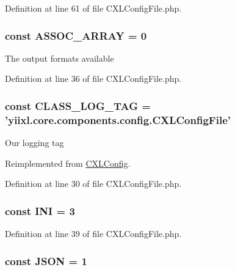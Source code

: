 Definition at line 61 of file CXLConfigFile.php.

\hypertarget{classCXLConfigFile_a97ec175641362d5bd37ac7fc47849bbb}{
\subsubsection[{ASSOC\_\-ARRAY}]{\setlength{\rightskip}{0pt plus 5cm}const {\bf ASSOC\_\-ARRAY} = 0}}
\label{classCXLConfigFile_a97ec175641362d5bd37ac7fc47849bbb}
The output formats available 

Definition at line 36 of file CXLConfigFile.php.

\hypertarget{classCXLConfigFile_aa607ab5e557e6ebb60b85c5a20ad067f}{
\subsubsection[{CLASS\_\-LOG\_\-TAG}]{\setlength{\rightskip}{0pt plus 5cm}const {\bf CLASS\_\-LOG\_\-TAG} = 'yiixl.core.components.config.CXLConfigFile'}}
\label{classCXLConfigFile_aa607ab5e557e6ebb60b85c5a20ad067f}
Our logging tag 

Reimplemented from \hyperlink{classCXLConfig_aa607ab5e557e6ebb60b85c5a20ad067f}{CXLConfig}.



Definition at line 30 of file CXLConfigFile.php.

\hypertarget{classCXLConfigFile_a5dd04489aced210c3386be64b79e25a4}{
\subsubsection[{INI}]{\setlength{\rightskip}{0pt plus 5cm}const {\bf INI} = 3}}
\label{classCXLConfigFile_a5dd04489aced210c3386be64b79e25a4}


Definition at line 39 of file CXLConfigFile.php.

\hypertarget{classCXLConfigFile_addb3dc7c4a57b9cee800f894e6dc2b4d}{
\subsubsection[{JSON}]{\setlength{\rightskip}{0pt plus 5cm}const {\bf JSON} = 1}}
\label{classCXLConfigFile_addb3dc7c4a57b9cee800f894e6dc2b4d}


